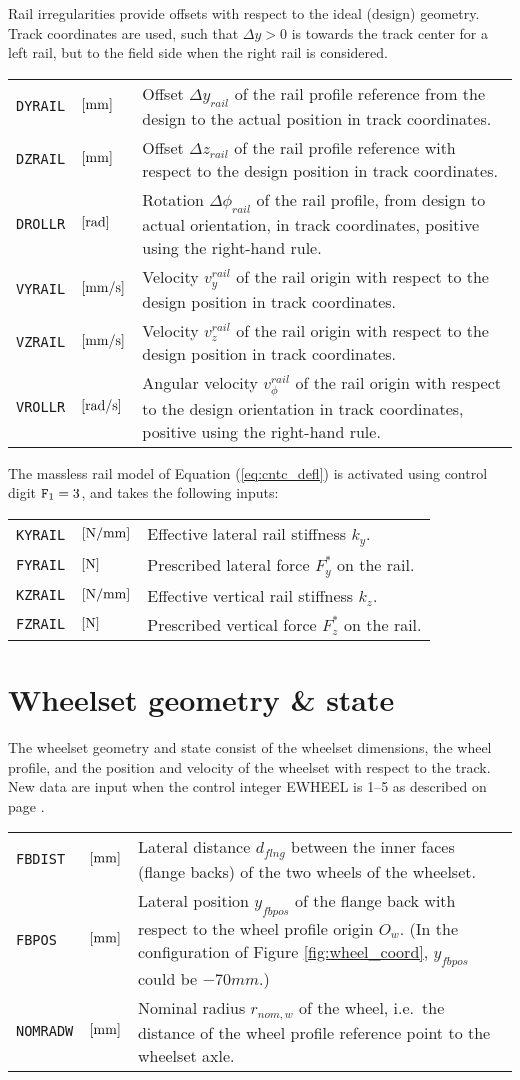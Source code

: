 \documentclass[12pt]{report}
\newenvironment{inputvars}{\vspace{0.4\baselineskip}%

\begin{tabular}{>{\raggedright}p{22mm}p{19mm}p{113mm}}}{
\end{tabular}

}
\newcommand{\inpvar}[3]{{\small\tt #1} & $#2$ & #3 \\[1ex]}
\begin{document}
Rail irregularities provide offsets with respect to the ideal (design)
geometry. Track coordinates are used, such that $\Delta y>0$ is towards
the track center for a left rail, but to the field side when the right rail
is considered.
\begin{inputvars}
\inpvar{DYRAIL}{\bunit{mm}}{Offset $\Delta y_{rail}$ of the rail profile
        reference from the design to the actual position in track coordinates.}
\inpvar{DZRAIL}{\bunit{mm}}{Offset $\Delta z_{rail}$ of the rail profile
        reference with respect to the design position in track coordinates.}
\inpvar{DROLLR}{\bunit{rad}}{Rotation $\Delta \phi_{rail}$ of the rail profile,
        from design to actual orientation, in track coordinates,
        positive using the right-hand rule.}
\inpvar{VYRAIL}{\bunit{mm/s}}{Velocity $v_y^{rail}$ of the rail origin with
        respect to the design position in track coordinates.}
\inpvar{VZRAIL}{\bunit{mm/s}}{Velocity $v_z^{rail}$ of the rail origin with
        respect to the design position in track coordinates.}
\inpvar{VROLLR}{\bunit{rad/s}}{Angular velocity $v_\phi^{rail}$ of the rail
        origin with respect to the design orientation in track coordinates,
        positive using the right-hand rule.}
\end{inputvars}

The massless rail model of Equation (\ref{eq:cntc_defl}) is activated using
control digit ${\tt F}_1=3$, and takes the following inputs:
\begin{inputvars}
\inpvar{KYRAIL}{\bunit{N/mm}}{Effective lateral rail stiffness $k_y$.}
\inpvar{FYRAIL}{\bunit{N}}{Prescribed lateral force $F_y^*$ on the rail.}
\inpvar{KZRAIL}{\bunit{N/mm}}{Effective vertical rail stiffness $k_z$.}
\inpvar{FZRAIL}{\bunit{N}}{Prescribed vertical force $F_z^*$ on the rail.}
\end{inputvars}
 
\section{Wheelset geometry \& state}
\label{sec:wheelset_geom}

The wheelset geometry and state consist of the wheelset dimensions, the
wheel profile, and the position and velocity of the wheelset with respect
to the track. New data are input when the control integer EWHEEL is 1--5
as described on page \pageref{e1-digit}.
\begin{inputvars}
\inpvar{FBDIST}{\bunit{mm}}{Lateral distance $d_{flng}$ between the inner faces
        (flange backs) of the two wheels of the wheelset.}
\inpvar{FBPOS}{\bunit{mm}}{Lateral position $y_{fbpos}$ of the flange back with
        respect to the wheel profile origin $O_w$. (In the configuration of
        Figure \ref{fig:wheel_coord}, $y_{fbpos}$ could be $-70\unit{mm}$.)}
\inpvar{NOMRADW}{\bunit{mm}}{Nominal radius $r_{nom,w}$ of the wheel, i.e.\ the
        distance of the wheel profile reference point to the wheelset axle.}
\end{inputvars}
\end{document}
